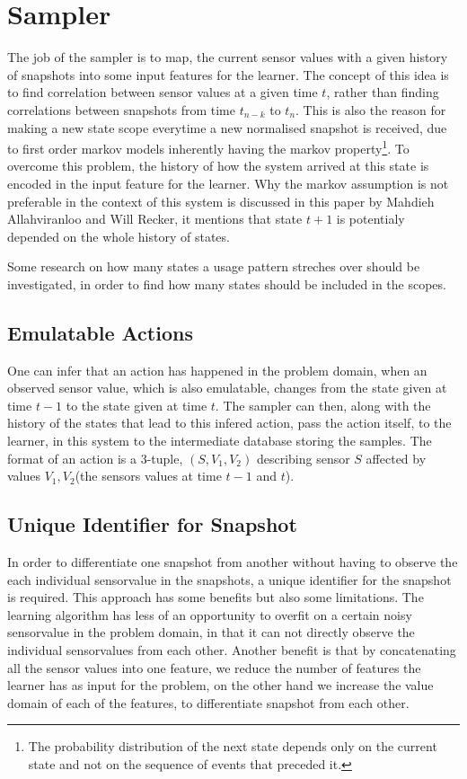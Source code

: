 \section{Sampler}
The job of the sampler is to map, the current sensor values with a given history of snapshots into some input features for the learner.
The concept of this idea is to find correlation between sensor values at a given time $t$, rather than finding correlations between snapshots from time $t_{n-k}$ to $t_n$. This is also the reason for making a new state scope everytime a new normalised snapshot is received, due to first order markov models inherently having the markov property\footnote{The probability distribution of the next state depends only on the current state and not on the sequence of events that preceded it.\cite{wiki_markov_chain}}. To overcome this problem, the history of how the system arrived at this state is encoded in the input feature for the learner. Why the markov assumption is not preferable in the context of this system is discussed in this paper\cite{Allahviranloo201316} by Mahdieh Allahviranloo and Will Recker, it mentions that state $t+1$ is potentialy depended on the whole history of states.

Some research on how many states a usage pattern streches over should be investigated, in order to find how many states should be included in the scopes.

\subsection{Emulatable Actions}
One can infer that an action has happened in the problem domain, when an observed sensor value, which is also emulatable, changes from the state given at time $t-1$ to the state given at time $t$. The sampler can then, along with the history of the states that lead to this infered action, pass the action itself, to the learner, in this system to the intermediate database storing the samples. The format of an action is a 3-tuple, $(S,V_1,V_2)$ describing sensor $S$ affected by values $V_1, V_2$(the sensors values at time $t-1$ and $t$).

\subsection{Unique Identifier for Snapshot}

In order to differentiate one snapshot from another without having to observe the each individual sensorvalue in the snapshots, a unique identifier for the snapshot is required.
This approach has some benefits but also some limitations. The learning algorithm has less of an opportunity to overfit on a certain noisy sensorvalue in the problem domain, in that it can not directly observe the individual sensorvalues from each other.
Another benefit is that by concatenating all the sensor values into one feature, we reduce the number of features the learner has as input for the problem, on the other hand we increase the value domain of each of the features, to differentiate snapshot from each other.

